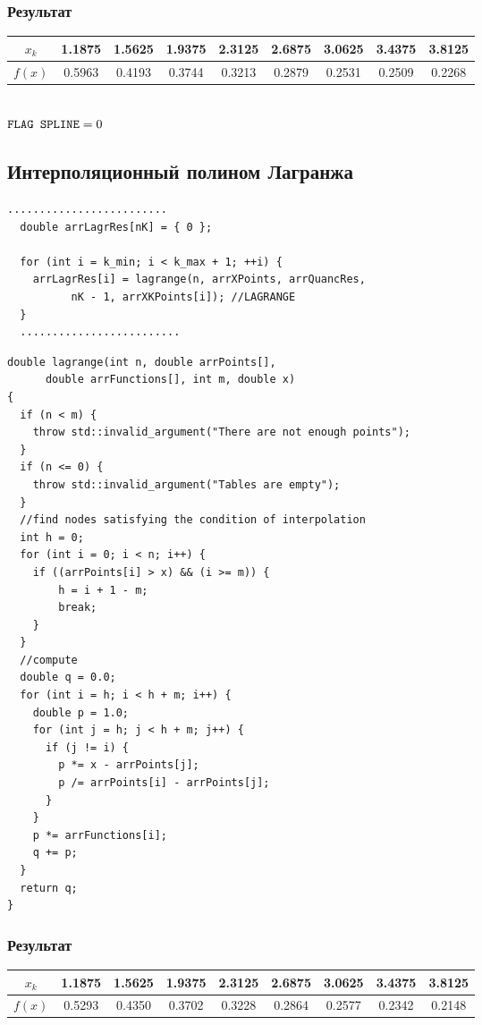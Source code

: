\documentclass[a4paper,11pt]{article}
\begin{document}
\subsubsection{Результат}
\begin{tabular}{ | c | c | c | c | c | c | c | c | c | }
  \hline
  \footnotesize
  $x_k$ & 1.1875 & 1.5625 & 1.9375 & 2.3125 & 2.6875 & 3.0625 & 3.4375 & 3.8125 \\ \hline
  $f(x)$ & 0.5963 & 0.4193 & 0.3744 & 0.3213 & 0.2879 & 0.2531 & 0.2509 & 0.2268 \\ \hline
\end{tabular} \\

$\verb|FLAG SPLINE| = 0$

\vspace{5mm}
\subsection{Интерполяционный полином Лагранжа}
\begin{lstlisting}[label=lagrange,caption=Построение полинома Лагранжа]
  .........................
  double arrLagrRes[nK] = { 0 };

  for (int i = k_min; i < k_max + 1; ++i) {
    arrLagrRes[i] = lagrange(n, arrXPoints, arrQuancRes,
          nK - 1, arrXKPoints[i]); //LAGRANGE
  }
  .........................
\end{lstlisting}

\begin{lstlisting}[label=lagrange,caption=lagrange.cpp]
double lagrange(int n, double arrPoints[],
      double arrFunctions[], int m, double x)
{
  if (n < m) {
    throw std::invalid_argument("There are not enough points");
  }
  if (n <= 0) {
    throw std::invalid_argument("Tables are empty");
  }
  //find nodes satisfying the condition of interpolation
  int h = 0;
  for (int i = 0; i < n; i++) {
    if ((arrPoints[i] > x) && (i >= m)) {
        h = i + 1 - m;
        break;
    }
  }
  //compute
  double q = 0.0;
  for (int i = h; i < h + m; i++) {
    double p = 1.0;
    for (int j = h; j < h + m; j++) {
      if (j != i) {
        p *= x - arrPoints[j];
        p /= arrPoints[i] - arrPoints[j];
      }
    }
    p *= arrFunctions[i];
    q += p;
  }
  return q;
}
\end{lstlisting}

\subsubsection{Результат}
\begin{tabular}{ | c | c | c | c | c | c | c | c | c | }
  \hline
  \footnotesize
  $x_k$ & 1.1875 & 1.5625 & 1.9375 & 2.3125 & 2.6875 & 3.0625 & 3.4375 & 3.8125 \\ \hline
  $f(x)$ & 0.5293 & 0.4350 & 0.3702 & 0.3228 & 0.2864 & 0.2577 & 0.2342 & 0.2148 \\ \hline
\end{tabular} \\
\end{document}
